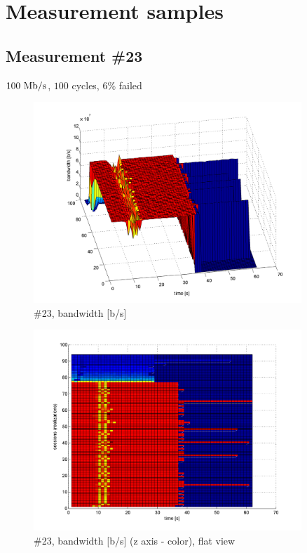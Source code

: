 \section*{Measurement samples}
\label{appendix:measurement-samples}
\subsection{Measurement \#23}
$100~\mathrm{Mb/s}$, $100$ cycles, 6\% failed
\begin{figure}[hp]
	\begin{center}
	\includegraphics[width=0.9\textwidth]{results-239-3d.png}
	\end{center}
	\caption[]{\#23, bandwidth [b/s]}
	\label{img:results-239-3d.png}
\end{figure}

\begin{figure}[hp]
	\begin{center}
	\includegraphics[width=0.9\textwidth]{results-239-2d.png}
	\end{center}
	\caption[]{\#23, bandwidth [b/s] (z axis - color), flat view}
	\label{img:results-239-2d.png}
\end{figure}
\FloatBarrier
\clearpage

